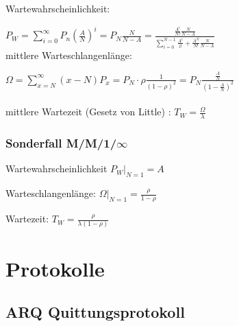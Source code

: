 \documentclass[fs, footer]{latex4ei}
\begin{document}
\begin{multicols*}{4}
{	Wartewahrscheinlichkeit:

	$P_W = \sum \limits_{i=0}^{\infty} P_n (\frac{A}{N})^i = P_N \frac{N}{N-A} = \frac{\frac{A^i}{N!} \frac{N}{N-A}}{\sum \limits_{i = 0}^{N-1} \frac{A^i}{i!} + \frac{A^N}{N!} \frac{N}{N-A}}$ \\

	mittlere Warteschlangenlänge:

	$\Omega = \sum \limits^{\infty}_{x = N} (x - N) P_x = P_N \cdot \rho \frac{1}{(1- \rho)^2} = P_N \frac{\frac{A}{N}}{(1 - \frac{A}{N})^2}$ \\ \\

	mittlere Wartezeit (Gesetz von Little) : $T_W = \frac{\Omega}{\lambda}$ \\ 



	\subsubsection{Sonderfall M/M/1/$\infty$}

	Wartewahrscheinlichkeit $P_W |_{N =1} = A$

	Warteschlangenlänge: $\Omega |_{N=1} = \frac{\rho}{1 - \rho}$

	Wartezeit: $T_W = \frac{\rho}{\lambda (1 - \rho)}$
}



\section{Protokolle}

\subsection{ARQ Quittungsprotokoll}




\end{multicols*}
\end{document}
